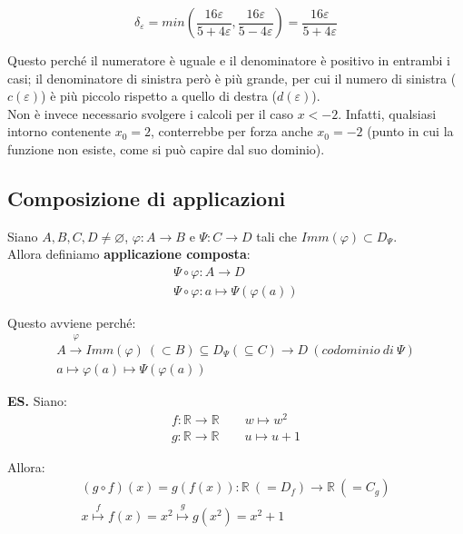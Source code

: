 \documentclass{article}
\begin{document}
\begin{equation*}
    \delta_\varepsilon = min\left(\frac{16\varepsilon}{5+4\varepsilon}, \frac{16\varepsilon}{5-4\varepsilon}\right) = \frac{16\varepsilon}{5+4\varepsilon}
\end{equation*}

\noindent Questo perché il numeratore è uguale e il denominatore è positivo in entrambi i casi; il denominatore di sinistra però è più grande, per cui il numero di sinistra ($c(\varepsilon)$) è più piccolo rispetto a quello di destra ($d(\varepsilon)$).\\

\noindent Non è invece necessario svolgere i calcoli per il caso $x < - 2$. Infatti, qualsiasi intorno contenente $x_0 = 2$, conterrebbe per forza anche $x_0 = -2$ (punto in cui la funzione non esiste, come si può capire dal suo dominio). 

\subsection{Composizione di applicazioni}
Siano $A, B, C, D \neq \varnothing$, $\varphi: A \xrightarrow{} B$ e $\Psi: C \xrightarrow{} D$ tali che $Imm(\varphi) \subset D_\Psi$.\\
Allora definiamo \textbf{applicazione composta}:
\begin{gather*}
    \Psi \circ \varphi: A \xrightarrow{} D \\
    \Psi \circ \varphi: a \longmapsto \Psi(\varphi(a))
\end{gather*}

\noindent Questo avviene perché:
\begin{gather*}
    A \overset{\varphi}{\xrightarrow{}} Imm(\varphi) \ (\subset B) \subseteq D_\Psi (\subseteq C) \xrightarrow{} D \ (codominio \ di \ \Psi)\\
    a \longmapsto \varphi(a) \longmapsto \Psi(\varphi(a))
\end{gather*}

\noindent\textbf{ES.} Siano: 
\begin{gather*}
    f: \mathbb{R} \xrightarrow{} \mathbb{R} \qquad w \longmapsto w^2\\
    g: \mathbb{R} \xrightarrow{} \mathbb{R} \qquad u \longmapsto u + 1
\end{gather*}

\noindent Allora: 
\begin{gather*}
    (g \circ f)(x) = g(f(x)): \mathbb{R} \ (= D_f)  \xrightarrow{} \mathbb{R} \ (= C_g) \\
    x \overset{f}{\longmapsto} f(x) = x^2 \overset{g}{\longmapsto} g(x^2) = x^2 + 1
\end{gather*}
\end{document}
